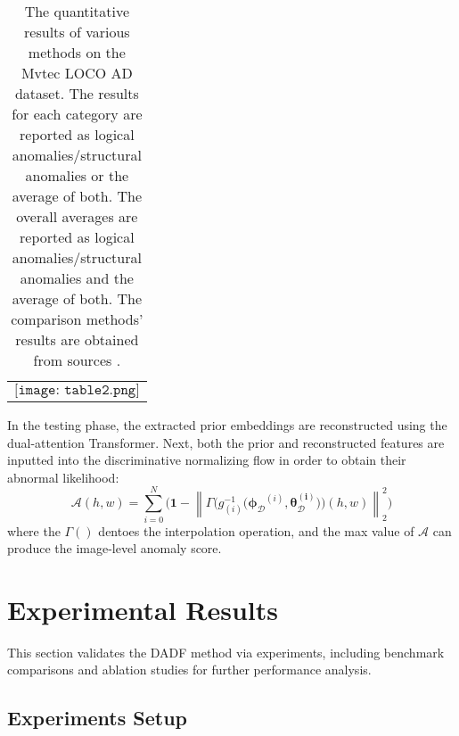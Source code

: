 \documentclass[journal]{IEEEtran}
\begin{document}
\begin{table*}
\caption{{The quantitative results of various methods on the Mvtec LOCO AD dataset. The results for each category are reported as logical anomalies/structural anomalies or the average of both. The overall averages are reported as logical anomalies/structural anomalies and the average of both. The comparison methods' results are obtained from sources \cite{r23,r24,r25}.}}

\label{table}
\setlength{\tabcolsep}{3pt}
\begin{threeparttable}
\begin{tabular}{p{\textwidth}}
$\texttt{[image: table2.png]}$
\end{tabular}
\end{threeparttable}
\label{table2}
\end{table*}

In the testing phase, the extracted prior embeddings are reconstructed using the dual-attention Transformer. Next, both the prior and reconstructed features are inputted into the discriminative normalizing flow in order to obtain their abnormal likelihood:
\begin{equation}
\mathcal{A}\left ( h,w \right )  = \sum_{i=0}^{N} \big (\mathbf{1}  - \left \|\Gamma \big( g^{-1}_{(i)}\big(  \boldsymbol{\phi_{\mathcal{D}}}^{(i)},\boldsymbol{\theta_{\mathcal{D}}^{(i)} }  \big) \big)\left ( h,w \right )  \right \|_{2}^{2} \big )  
\end{equation}
where the $\Gamma()$ dentoes the interpolation operation, and the max value of $\mathcal{A}$ can produce the image-level anomaly score.


\section{Experimental Results}
This section validates the DADF method via experiments, including benchmark comparisons and ablation studies for further performance analysis.

\subsection{Experiments Setup}
\end{document}
